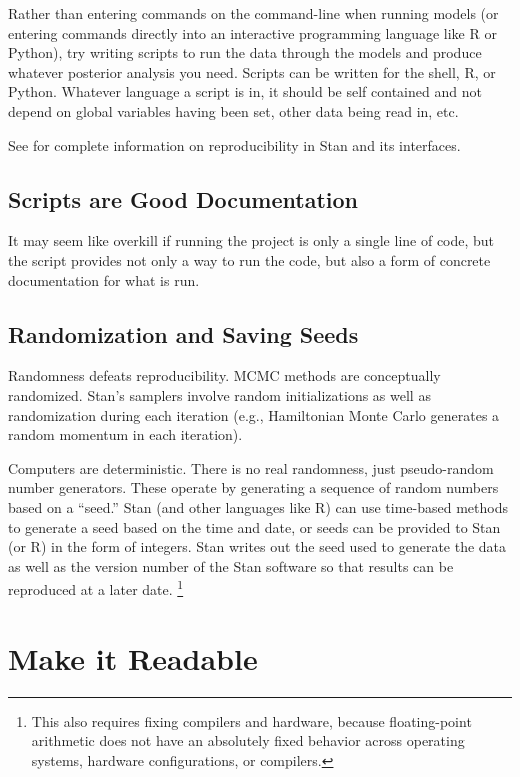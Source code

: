 Rather than entering commands on the command-line when running models
(or entering commands directly into an interactive programming
language like R or Python), try writing scripts to run the data
through the models and produce whatever posterior analysis you need.
Scripts can be written for the shell, R, or Python.  Whatever language
a script is in, it should be self contained and not depend on global
variables having been set, other data being read in, etc.  

See  for complete information on
reproducibility in Stan and its interfaces.

\subsection{Scripts are Good Documentation}

It may seem like overkill if running the project is only a single line
of code, but the script provides not only a way to run the code, but
also a form of concrete documentation for what is run. 


\subsection{Randomization and Saving Seeds}

Randomness defeats reproducibility.  MCMC methods are conceptually
randomized.  Stan's samplers involve random initializations as well as
randomization during each iteration (e.g., Hamiltonian Monte Carlo
generates a random momentum in each iteration).

Computers are deterministic.  There is no real randomness, just
pseudo-random number generators.  These operate by generating a
sequence of random numbers based on a ``seed.''  Stan (and other
languages like R) can use time-based methods to generate a seed based
on the time and date, or seeds can be provided to Stan (or R) in the
form of integers.  Stan writes out the seed used to generate the
data as well as the version number of the Stan software so that
results can be reproduced at a later date.%
%
\footnote{This also requires fixing compilers and hardware, because
  floating-point arithmetic does not have an absolutely fixed behavior
  across operating systems, hardware configurations, or compilers.}



\section{Make it Readable}

